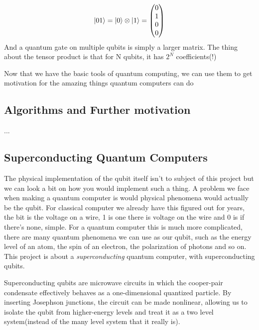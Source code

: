\documentclass[english, a4paper, 12pt, twoside]{article}
\numberwithin{equation}{section} %
\begin{document}
\[\ket{01} = \ket{0} \otimes \ket{1} =
\begin{pmatrix}
    0 \\
    1 \\
    0 \\
    0
\end{pmatrix}\]
And a quantum gate on multiple qubits is simply a larger matrix. 
The thing about the tensor product is that for N qubits, it has $2^N$ coefficients(!) %

Now that we have the basic tools of quantum computing, we can use them to get motivation for the amazing things quantum computers can do

\subsection{Algorithms and Further motivation}
...
\subsection{Superconducting Quantum Computers}  %
The physical implementation of the qubit itself isn't to subject of this project but we can look a bit on how you would implement such a thing. A problem we face when making a quantum computer is would physical phenomena would actually be the qubit. For classical computer we already have this figured out for years, the bit is the voltage on a wire, 1 is one there is voltage on the wire and 0 is if there's none, simple. For a quantum computer this is much more complicated, there are many quantum phenomena we can use as our qubit, such as the energy level of an atom, the spin of an electron, the polarization of photons and so on. This project is about a \textit{superconducting} quantum computer, with superconducting  qubits.

Superconducting qubits are microwave circuits in which the cooper-pair condensate effectively behaves as a one-dimensional quantized particle. By inserting Josephson junctions, the circuit can be made nonlinear, allowing us to isolate the qubit from higher-energy levels and treat it as a two  level system(instead of the many level system that it really is).
\newpage
\end{document}
